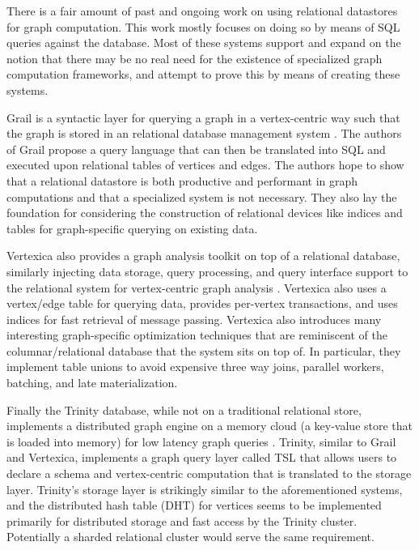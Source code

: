 \documentclass[11pt,letterpaper]{article}
\begin{document}
There is a fair amount of past and ongoing work on using relational datastores for graph computation. This work mostly focuses on doing so by means of SQL queries against the database. Most of these systems support and expand on the notion that there may be no real need for the existence of specialized graph computation frameworks, and attempt to prove this by means of creating these systems.

Grail \cite{fan_case_2015} is a syntactic layer for querying a graph in a vertex-centric way such that the graph is stored in an relational database management system
\cite{fan_case_2015}. The authors of Grail propose a query language that can then be translated into SQL and executed upon relational tables of vertices and edges. The authors hope to show that a relational datastore is both productive and performant in graph computations and that a specialized system is not necessary. They also lay the foundation for considering the construction of relational devices like indices and tables for graph-specific querying on existing data.

Vertexica \cite{jindal_vertexica:_2014} also provides a graph analysis toolkit on top of a relational database, similarly injecting data storage, query processing, and query interface support to the relational system for vertex-centric graph analysis \cite{jindal_vertexica:_2014}. Vertexica also uses a vertex/edge table for querying data, provides per-vertex transactions, and uses indices for fast retrieval of message passing. Vertexica also introduces many interesting graph-specific optimization techniques that are reminiscent of the columnar/relational database that the system sits on top of. In particular, they implement table unions to avoid expensive three way joins, parallel workers, batching, and late materialization.

Finally the Trinity \cite{shao_trinity:_2013} database, while not on a traditional relational store, implements a distributed graph engine on a memory cloud (a key-value store that is loaded into memory) for low latency graph queries \cite{shao_trinity:_2013}. Trinity, similar to Grail and Vertexica, implements a graph query layer called TSL that allows users to declare a schema and vertex-centric computation that is translated to the storage layer. Trinity's storage layer is strikingly similar to the aforementioned systems, and the distributed hash table (DHT) for vertices seems to be implemented primarily for distributed storage and fast access by the Trinity cluster. Potentially a sharded relational cluster would serve the same requirement.
\end{document}
